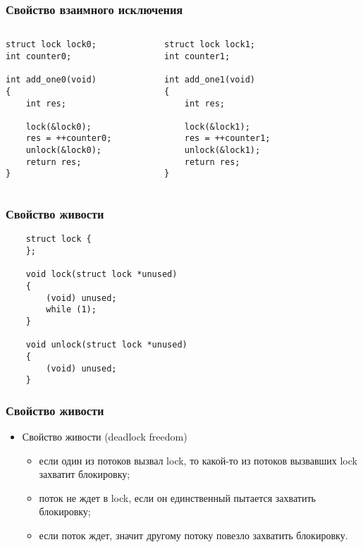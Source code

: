 \begin{frame}[fragile]
\frametitle{Свойство взаимного исключения}
\begin{columns}
    \begin{column}{.4\textwidth}
        \begin{lstlisting}
struct lock lock0;
int counter0;

int add_one0(void)
{
    int res;

    lock(&lock0);
    res = ++counter0;
    unlock(&lock0);
    return res;
}
        \end{lstlisting}
    \end{column}
    \begin{column}{.4\textwidth}
        \begin{lstlisting}
struct lock lock1;
int counter1;

int add_one1(void)
{
    int res;

    lock(&lock1);
    res = ++counter1;
    unlock(&lock1);
    return res;
}
        \end{lstlisting}
    \end{column}
    \begin{column}{.2\textwidth}
    \end{column}
\end{columns}
\end{frame}

\begin{frame}[fragile]
\frametitle{Свойство живости}
\begin{lstlisting}
    struct lock {
    };

    void lock(struct lock *unused)
    {
        (void) unused;
        while (1);
    }

    void unlock(struct lock *unused)
    {
        (void) unused;
    }
\end{lstlisting}
\end{frame}

\begin{frame}
\frametitle{Свойство живости}
\begin{itemize}
    \item<1->Свойство живости (deadlock freedom)
    \begin{itemize}
        \item<2->если один из потоков вызвал lock, то какой-то из
             потоков вызвавших lock захватит блокировку;
        \item<3->поток не ждет в lock, если он единственный пытается захватить
             блокировку;
        \item<4->если поток ждет, значит другому потоку повезло захватить
             блокировку.
    \end{itemize}
\end{itemize}
\end{frame}

